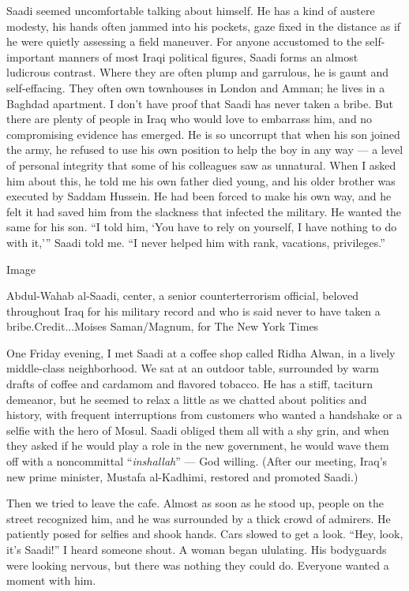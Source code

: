Saadi seemed uncomfortable talking about himself. He has a kind of
austere modesty, his hands often jammed into his pockets, gaze fixed in
the distance as if he were quietly assessing a field maneuver. For
anyone accustomed to the self-important manners of most Iraqi political
figures, Saadi forms an almost ludicrous contrast. Where they are often
plump and garrulous, he is gaunt and self-effacing. They often own
townhouses in London and Amman; he lives in a Baghdad apartment. I don't
have proof that Saadi has never taken a bribe. But there are plenty of
people in Iraq who would love to embarrass him, and no compromising
evidence has emerged. He is so uncorrupt that when his son joined the
army, he refused to use his own position to help the boy in any way ---
a level of personal integrity that some of his colleagues saw as
unnatural. When I asked him about this, he told me his own father died
young, and his older brother was executed by Saddam Hussein. He had been
forced to make his own way, and he felt it had saved him from the
slackness that infected the military. He wanted the same for his son.
``I told him, `You have to rely on yourself, I have nothing to do with
it,''' Saadi told me. ``I never helped him with rank, vacations,
privileges.''

Image

Abdul-Wahab al-Saadi, center, a senior counterterrorism official,
beloved throughout Iraq for his military record and who is said never to
have taken a bribe.Credit...Moises Saman/Magnum, for The New York Times

One Friday evening, I met Saadi at a coffee shop called Ridha Alwan, in
a lively middle-class neighborhood. We sat at an outdoor table,
surrounded by warm drafts of coffee and cardamom and flavored tobacco.
He has a stiff, taciturn demeanor, but he seemed to relax a little as we
chatted about politics and history, with frequent interruptions from
customers who wanted a handshake or a selfie with the hero of Mosul.
Saadi obliged them all with a shy grin, and when they asked if he would
play a role in the new government, he would wave them off with a
noncommittal ``\emph{inshallah}'' --- God willing. (After our meeting,
Iraq's new prime minister, Mustafa al-Kadhimi, restored and promoted
Saadi.)

Then we tried to leave the cafe. Almost as soon as he stood up, people
on the street recognized him, and he was surrounded by a thick crowd of
admirers. He patiently posed for selfies and shook hands. Cars slowed to
get a look. ``Hey, look, it's Saadi!'' I heard someone shout. A woman
began ululating. His bodyguards were looking nervous, but there was
nothing they could do. Everyone wanted a moment with him.


